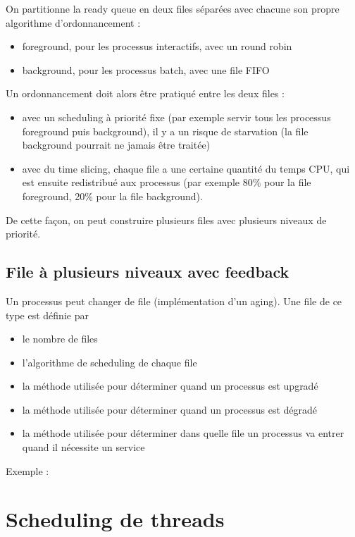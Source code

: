 On partitionne  la ready queue en deux files séparées avec chacune son propre algorithme d'ordonnancement :

\begin{itemize}
	\item foreground, pour les processus interactifs, avec un round robin
	\item background, pour les processus batch, avec une file FIFO
\end{itemize}

Un ordonnancement doit alors être pratiqué entre les deux files :

\begin{itemize}
	\item avec un scheduling à priorité fixe (par exemple servir tous les processus foreground puis background), il y a un risque de starvation (la file background pourrait ne jamais être traitée)
	\item avec du time slicing, chaque file a une certaine quantité du temps CPU, qui est ensuite redistribué aux processus (par exemple 80\% pour la file foreground, 20\% pour la file background).
\end{itemize}

De cette façon, on peut construire plusieurs files avec plusieurs niveaux de priorité.

\subsection{File à plusieurs niveaux avec feedback}

Un processus peut changer de file (implémentation d'un aging). Une file de ce type est définie par

\begin{itemize}
	\item le nombre de files
	\item l'algorithme de scheduling de chaque file
	\item la méthode utilisée pour déterminer quand un processus est upgradé
	\item la méthode utilisée pour déterminer quand un processus est dégradé
	\item la méthode utilisée pour déterminer dans quelle file un processus va entrer quand il nécessite un service
\end{itemize}

Exemple :


\section{Scheduling de threads}


